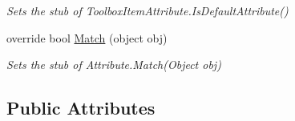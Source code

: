 \begin{DoxyCompactItemize}
\begin{DoxyCompactList}\small\item\em Sets the stub of Toolbox\-Item\-Attribute.\-Is\-Default\-Attribute()\end{DoxyCompactList}\item 
override bool \hyperlink{class_system_1_1_component_model_1_1_fakes_1_1_stub_toolbox_item_attribute_a685e6dc984c9b40bc3c05d03e8507f58}{Match} (object obj)
\begin{DoxyCompactList}\small\item\em Sets the stub of Attribute.\-Match(\-Object obj)\end{DoxyCompactList}\end{DoxyCompactItemize}
\subsection*{Public Attributes}
